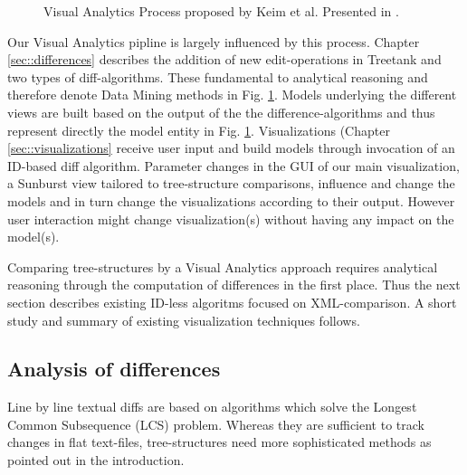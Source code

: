 \begin{figure}[htb]
\caption{\label{fig:visualanalyticsprocess} Visual Analytics Process proposed by Keim et al. Presented in \cite{keim2008visual}.}
\end{figure}

Our Visual Analytics pipline is largely influenced by this process. Chapter \ref{sec::differences} describes the addition of new edit-operations in Treetank and two types of diff-algorithms. These fundamental to analytical reasoning and therefore denote Data Mining methods in Fig. \ref{fig:visualanalyticsprocess}. Models underlying the different views are built based on the output of the the difference-algorithms and thus represent directly the model entity in Fig. \ref{fig:visualanalyticsprocess}. Visualizations (Chapter \ref{sec::visualizations} receive user input and build models through invocation of an ID-based diff algorithm. Parameter changes in the GUI of our main visualization, a Sunburst view tailored to tree-structure comparisons, influence and change the models and in turn change the visualizations according to their output. However user interaction might change visualization(s) without having any impact on the model(s).

Comparing tree-structures by a Visual Analytics approach requires analytical reasoning through the computation of differences in the first place. Thus the next section describes existing ID-less algoritms focused on XML-comparison. A short study and summary of existing visualization techniques follows.

\subsection{Analysis of differences}
Line by line textual diffs are based on algorithms which solve the Longest Common Subsequence (LCS) problem. Whereas they are sufficient to track changes in flat text-files, tree-structures need more sophisticated methods as pointed out in the introduction.

